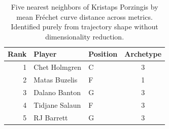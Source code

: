 \begin{table}[htbp]
  \centering\small
  \begin{tabular}{rllc}
    \toprule
    Rank & Player & Position & Archetype \\
    \midrule
    1 & Chet Holmgren & C & 3 \\
    2 & Matas Buzelis & F & 1 \\
    3 & Dalano Banton & G & 3 \\
    4 & Tidjane Salaun & F & 3 \\
    5 & RJ Barrett & G & 3 \\
    \bottomrule
  \end{tabular}
  \caption{Five nearest neighbors of Kristaps Porzingis by mean Fr\'{e}chet curve distance across metrics. Identified purely from trajectory shape without dimensionality reduction.}
  \label{tab:Kristaps_Porzingis_frechet_curve_neighbors}
\end{table}

